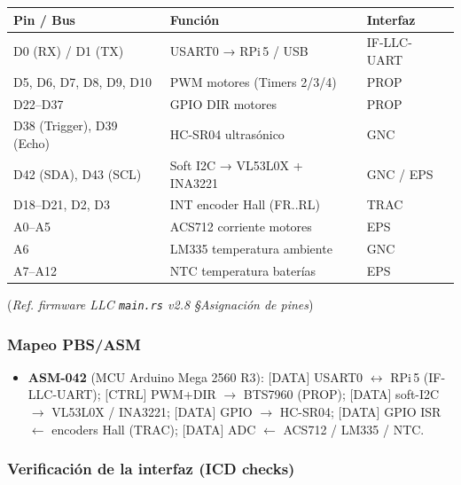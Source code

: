 \begin{center}
\small
\renewcommand{\arraystretch}{1.3}
\begin{tabular}{lll}
\toprule
\textbf{Pin / Bus} & \textbf{Función} & \textbf{Interfaz} \\
\midrule
D0 (RX) / D1 (TX)   & USART0 → RPi\,5 / USB    & IF-LLC-UART \\
D5, D6, D7, D8, D9, D10 & PWM motores (Timers 2/3/4) & PROP \\
D22–D37              & GPIO DIR motores           & PROP \\
D38 (Trigger), D39 (Echo) & HC-SR04 ultrasónico  & GNC \\
D42 (SDA), D43 (SCL) & Soft I2C → VL53L0X + INA3221 & GNC / EPS \\
D18–D21, D2, D3      & INT encoder Hall (FR..RL)  & TRAC \\
A0–A5                & ACS712 corriente motores   & EPS \\
A6                   & LM335 temperatura ambiente & GNC \\
A7–A12               & NTC temperatura baterías   & EPS \\
\bottomrule
\end{tabular}
\end{center}
(\emph{Ref. firmware LLC \texttt{main.rs} v2.8 §Asignación de pines})

\subsubsection{Mapeo PBS/ASM}

\begin{itemize}
  \item \textbf{ASM-042} (MCU Arduino Mega 2560 R3):
        [DATA] USART0 $\leftrightarrow$ RPi\,5 (IF-LLC-UART);
        [CTRL] PWM+DIR $\rightarrow$ BTS7960 (PROP);
        [DATA] soft-I2C $\rightarrow$ VL53L0X / INA3221;
        [DATA] GPIO $\rightarrow$ HC-SR04;
        [DATA] GPIO ISR $\leftarrow$ encoders Hall (TRAC);
        [DATA] ADC $\leftarrow$ ACS712 / LM335 / NTC.
\end{itemize}

\subsubsection{Verificación de la interfaz (ICD checks)}

